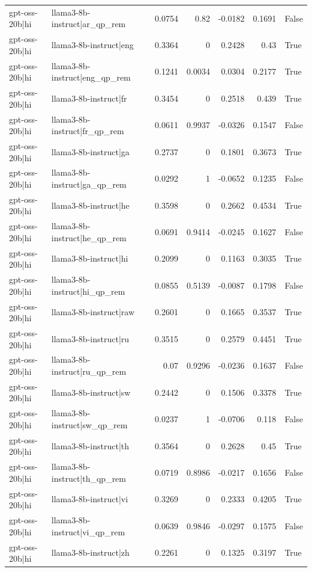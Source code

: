 \begin{table}
\begin{tabular}{l l r r r r l}
gpt-oss-20b|hi & llama3-8b-instruct|ar_qp_rem & 0.0754 & 0.82 & -0.0182 & 0.1691 & False \\
gpt-oss-20b|hi & llama3-8b-instruct|eng & 0.3364 & 0 & 0.2428 & 0.43 & True \\
gpt-oss-20b|hi & llama3-8b-instruct|eng_qp_rem & 0.1241 & 0.0034 & 0.0304 & 0.2177 & True \\
gpt-oss-20b|hi & llama3-8b-instruct|fr & 0.3454 & 0 & 0.2518 & 0.439 & True \\
gpt-oss-20b|hi & llama3-8b-instruct|fr_qp_rem & 0.0611 & 0.9937 & -0.0326 & 0.1547 & False \\
gpt-oss-20b|hi & llama3-8b-instruct|ga & 0.2737 & 0 & 0.1801 & 0.3673 & True \\
gpt-oss-20b|hi & llama3-8b-instruct|ga_qp_rem & 0.0292 & 1 & -0.0652 & 0.1235 & False \\
gpt-oss-20b|hi & llama3-8b-instruct|he & 0.3598 & 0 & 0.2662 & 0.4534 & True \\
gpt-oss-20b|hi & llama3-8b-instruct|he_qp_rem & 0.0691 & 0.9414 & -0.0245 & 0.1627 & False \\
gpt-oss-20b|hi & llama3-8b-instruct|hi & 0.2099 & 0 & 0.1163 & 0.3035 & True \\
gpt-oss-20b|hi & llama3-8b-instruct|hi_qp_rem & 0.0855 & 0.5139 & -0.0087 & 0.1798 & False \\
gpt-oss-20b|hi & llama3-8b-instruct|raw & 0.2601 & 0 & 0.1665 & 0.3537 & True \\
gpt-oss-20b|hi & llama3-8b-instruct|ru & 0.3515 & 0 & 0.2579 & 0.4451 & True \\
gpt-oss-20b|hi & llama3-8b-instruct|ru_qp_rem & 0.07 & 0.9296 & -0.0236 & 0.1637 & False \\
gpt-oss-20b|hi & llama3-8b-instruct|sw & 0.2442 & 0 & 0.1506 & 0.3378 & True \\
gpt-oss-20b|hi & llama3-8b-instruct|sw_qp_rem & 0.0237 & 1 & -0.0706 & 0.118 & False \\
gpt-oss-20b|hi & llama3-8b-instruct|th & 0.3564 & 0 & 0.2628 & 0.45 & True \\
gpt-oss-20b|hi & llama3-8b-instruct|th_qp_rem & 0.0719 & 0.8986 & -0.0217 & 0.1656 & False \\
gpt-oss-20b|hi & llama3-8b-instruct|vi & 0.3269 & 0 & 0.2333 & 0.4205 & True \\
gpt-oss-20b|hi & llama3-8b-instruct|vi_qp_rem & 0.0639 & 0.9846 & -0.0297 & 0.1575 & False \\
gpt-oss-20b|hi & llama3-8b-instruct|zh & 0.2261 & 0 & 0.1325 & 0.3197 & True \\

\end{tabular}
\end{table}
